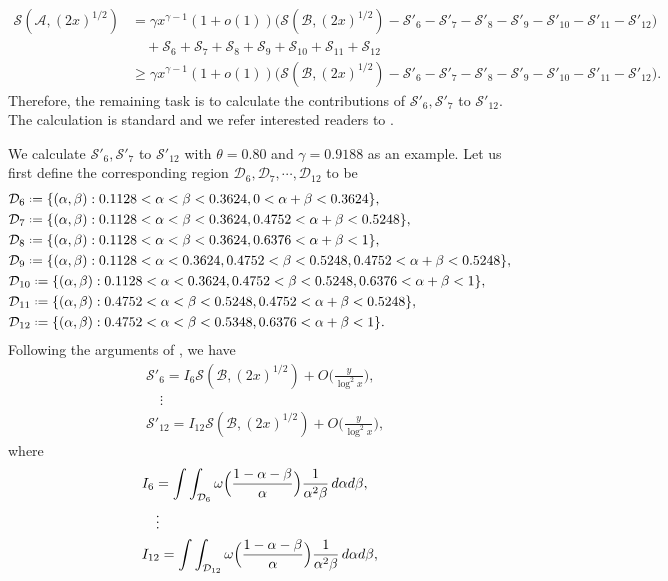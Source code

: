 \documentclass[12pt, reqno, twoside, letterpaper]{amsart}
\numberwithin{equation}{section}
\newcommand{\cA}{\ensuremath{\mathcal{A}}}
\newcommand{\cB}{\ensuremath{\mathcal{B}}}
\newcommand{\cD}{\ensuremath{\mathcal{D}}}
\newcommand{\cS}{\ensuremath{\mathcal{S}}}
\theoremstyle{customthm}
\theoremstyle{customrem}
\newcommand*{\defeq}{\mathrel{\vcenter{\baselineskip0.5ex \lineskiplimit0pt
			\hbox{\scriptsize.}\hbox{\scriptsize.}}}%
	=}
\def\int{\intop\nolimits}
\begin{document}
\begin{align} \label{s100}
\nonumber \cS(\cA,(2x)^{1/2}) &= \gamma x^{\gamma-1} (1+o(1)) \Big( \cS(\cB,(2x)^{1/2}) - \cS'_6 - \cS'_7 - \cS'_8 - \cS'_9 - \cS'_{10} - \cS'_{11} - \cS'_{12}\Big)  \\
\nonumber &\quad + \cS_6 + \cS_7 + \cS_8+\cS_9+\cS_{10}+\cS_{11}+\cS_{12} \\
&\geqslant \gamma x^{\gamma-1} (1+o(1)) \Big( \cS(\cB,(2x)^{1/2}) - \cS'_6 - \cS'_7 - \cS'_8 - \cS'_9 - \cS'_{10} - \cS'_{11} - \cS'_{12}\Big).
\end{align}
Therefore, the remaining task is to calculate the contributions of $\cS'_6 , \cS'_7$ to $\cS'_{12}$. The calculation is standard and we refer interested readers to \cite[Page~14-17]{Ha}. 

We calculate $\cS'_6 , \cS'_7$ to $\cS'_{12}$ with $\theta=0.80$ and $\gamma=0.9188$ as an example. Let us first define the corresponding region $\cD_6, \cD_7, \cdots ,\cD_{12}$ to be
\begin{align*}
&\cD_6 \defeq \{ (\alpha,\beta) : 0.1128 < \alpha < \beta < 0.3624, 0 < \alpha + \beta <0.3624 \},\\
&\cD_7 \defeq \{ (\alpha,\beta) : 0.1128 < \alpha < \beta < 0.3624, 0.4752 < \alpha + \beta < 0.5248 \},\\
&\cD_8 \defeq \{ (\alpha,\beta) : 0.1128 < \alpha < \beta < 0.3624, 0.6376 < \alpha + \beta < 1 \},\\
&\cD_9 \defeq \{ (\alpha,\beta) : 0.1128 < \alpha < 0.3624, 0.4752 < \beta < 0.5248, 0.4752 < \alpha + \beta < 0.5248 \},\\
&\cD_{10} \defeq \{ (\alpha,\beta) : 0.1128 < \alpha < 0.3624, 0.4752 < \beta < 0.5248, 0.6376 < \alpha + \beta < 1 \},\\
&\cD_{11} \defeq \{ (\alpha,\beta) : 0.4752 < \alpha < \beta < 0.5248, 0.4752 < \alpha + \beta < 0.5248 \},\\
&\cD_{12} \defeq \{ (\alpha,\beta) : 0.4752 < \alpha < \beta < 0.5348, 0.6376 < \alpha + \beta < 1 \}.
\end{align*}
Following the arguments of \cite[Page~14-17]{Ha}, we have
\begin{align*}
&\cS'_6 = I_6 \cS(\cB,(2x)^{1/2}) + O\Big(\frac{y}{\log ^2x}\Big), \\
&\quad \vdots \\
&\cS'_{12} = I_{12} \cS(\cB,(2x)^{1/2}) + O\Big(\frac{y}{\log ^2x}\Big),
\end{align*}
where
\begin{align*}
&I_6 = \int\int_{\cD_6} \omega\Big(\frac{1-\alpha-\beta}{\alpha}\Big)\frac{1}{\alpha^2 \beta} \, d\alpha d\beta, \\
&\quad \vdots \\
&I_{12} = \int\int_{\cD_{12}} \omega\Big(\frac{1-\alpha-\beta}{\alpha}\Big)\frac{1}{\alpha^2 \beta} \, d\alpha d\beta,
\end{align*}
\end{document}
